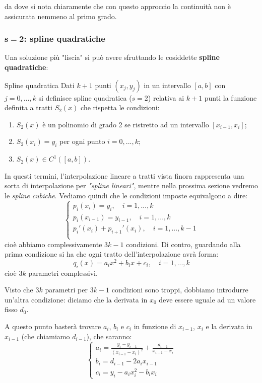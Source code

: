 \documentclass[a4paper,11pt]{article}
\begin{document}
\par\medskip

da dove si nota chiaramente che con questo approccio la continuità non è assicurata nemmeno al primo grado.

\subsubsection{$\mathbf{s = 2}$: spline quadratiche}
Una soluzione più "liscia" si può avere sfruttando le cosiddette \textbf{spline quadratiche}:
\begin{definition}{Spline quadratica}
	Dati $k + 1$ punti $(x_j, y_j)$ in un intervallo $[a, b]$ con $j = 0, ..., k$ si definisce spline quadratica ($s = 2$) relativa ai $k + 1$ punti la funzione definita a tratti $S_2(x)$ che rispetta le condizioni:
	\begin{enumerate}
		\item $S_2(x)$ è un polinomio di grado 2 se ristretto ad un intervallo $[x_{i - 1}, x_i]$;
		\item $S_2(x_i) = y_i$ per ogni punto $i = 0, ..., k$;
		\item $S_2(x) \in C^1([a, b])$.
	\end{enumerate}
\end{definition}
In questi termini, l'interpolazione lineare a tratti vista finora rappresenta una sorta di interpolazione per \textit{"spline lineari"}, mentre nella prossima sezione vedremo le \textit{spline cubiche}.
Vediamo quindi che le condizioni imposte equivalgono a dire:
\[
	\begin{cases}
		p_i(x_i) = y_i, \quad i = 1, ..., k \\ 
		p_i(x_{i - 1}) = y_{i - 1}, \quad i = 1, ..., k \\ 
		p_i'(x_i) + p_{i + 1}'(x_i), \quad i = 1, ..., k - 1 \\ 
	\end{cases}
\]
cioè abbiamo complessivamente $3k - 1$ condizioni.
Di contro, guardando alla prima condizione si ha che ogni tratto dell'interpolazione avrà forma:
$$
q_i(x) = a_i x^2 + b_i x + c_i, \quad i = 1, ..., k
$$
cioè $3k$ parametri complessivi.

Visto che $3k$ parametri per $3k - 1$ condizioni sono troppi, dobbiamo introdurre un'altra condizione: diciamo che la derivata in $x_0$ deve essere uguale ad un valore fisso $d_0$.

A questo punto basterà trovare $a_i$, $b_i$ e $c_i$ in funzione di $x_{i - 1}$, $x_i$ e la derivata in $x_{i - 1}$ (che chiamiamo $d_{i-1}$), che saranno:
\[
	\begin{cases}
		a_i  =\frac{y_{i}-y_{i-1}}{\left(x_{i-1}-x_{i}\right)^{2}}+\frac{d_{i-1}}{x_{i-1}-x_{i}} \\ 
		b_i = d_{i - 1} -2a_ix_{i-1} \\
		c_i = y_{i}-a_ix_{i}^{2}-b_ix_{i}
	\end{cases}
\]
\end{document}
